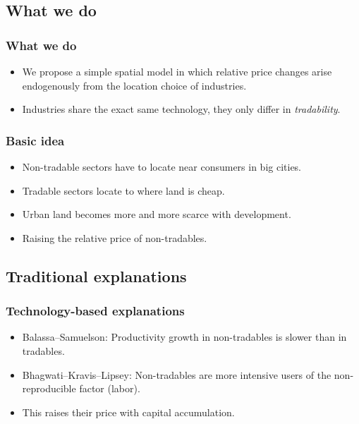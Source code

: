 \documentclass[compress,mathserif]{beamer}
\newcounter{perc}
\newcounter{percek}
\renewcommand{\time}[1]{\addtocounter{percek}{#1}}
\begin{document}
\time 2


\subsection{What we do}
\begin{frame}\frametitle{What we do}

\begin{itemize}
    \item We propose a simple spatial model in which relative price changes arise endogenously from the location choice of industries.
    \item Industries share the exact same technology, they only differ in \emph{tradability}.
\end{itemize}

\end{frame}

\begin{frame}\frametitle{Basic idea}
\begin{itemize}
    \item Non-tradable sectors have to locate near consumers in big cities.
    \item Tradable sectors locate to where land is cheap.
    \item Urban land becomes more and more scarce with development.
    \item Raising the relative price of non-tradables.
\end{itemize}
\end{frame}
\time{2}


\subsection{Traditional explanations}
\begin{frame}\frametitle{Technology-based explanations}

\begin{itemize}
    \item Balassa--Samuelson: Productivity growth in non-tradables is slower than in tradables.
    \item Bhagwati--Kravis--Lipsey: Non-tradables are more intensive users of the non-reproducible factor (labor).
    \item This raises their price with capital accumulation.
\end{itemize}
\end{frame}
\end{document}

